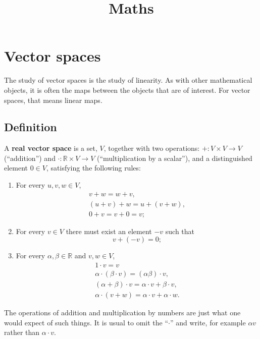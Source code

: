 \documentclass[10pt, a4paper, twocolumn]{article}
\title{Maths}
\newcommand{\R}{\mathbb{R}}
\newcommand{\defn}[1]{\textbf{#1}}
\begin{document}
\maketitle

\section{Vector spaces}
The study of vector spaces is the study of linearity. As with other mathematical
objects, it is often the maps between the objects that are of interest. For
vector spaces, that means linear maps.

\subsection{Definition}

A \defn{real vector space} is a set, $V$, together with two operations: ${+}:V \times V \to V$ (“addition”)
and ${\cdot}:\R \times V \to V$ (“multiplication by a scalar”), and a distinguished element $ 0\in V$, satisfying
the following rules:
\begin{enumerate}
\item
  For every $u, v, w \in V$,
  \begin{equation*}
    \begin{gathered}
      v + w = w + v, \\
      (u + v) + w = u + (v + w), \\
      0 + v = v + 0 = v;
      \end{gathered}
  \end{equation*}
\item For every $v \in V$ there must exist an element $-v$ such that
  \begin{equation*}
    v + (-v) = 0; 
  \end{equation*}
\item For every $\alpha, \beta \in \R$ and $v, w \in V$,
  \begin{equation*}
    \begin{gathered}
      1 \cdot v = v \\
      \alpha \cdot (\beta \cdot v) = (\alpha \beta) \cdot v, \\
      (\alpha + \beta) \cdot v = \alpha \cdot v + \beta \cdot v, \\
      \alpha \cdot (v + w) = \alpha \cdot v + \alpha \cdot w.
    \end{gathered}
  \end{equation*}
\end{enumerate}
The operations of addition and multiplication by numbers are just what one would expect of such
things. It is usual to omit the “$\cdot$” and write, for example $\alpha v$ rather than $\alpha \cdot v$.
\end{document}
